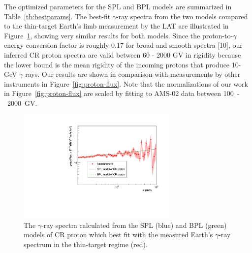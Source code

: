 The optimized parameters  for the SPL and BPL models are summarized in Table~\ref{tb:bestparams}. 
The best-fit $\gamma$-ray spectra from the two models
compared to the thin-target Earth's limb measurement by the LAT are illustrated
in Figure~\ref{fig:gamma-flux}, showing very similar results for both models.
Since the proton-to-$\gamma$ energy conversion factor is roughly 0.17 for broad
and smooth spectra [10], our inferred CR proton spectra are valid between 60 - 2000 GV
in rigidity
because the lower bound is the mean rigidity of the incoming protons that produce 10-GeV $\gamma$ rays.
Our results are shown in comparison with measurements by other instruments in Figure~\ref{fig:proton-flux}.
Note that the normalizations of our work in Figure~\ref{fig:proton-flux} are scaled
by fitting to AMS-02 data between 100~-~2000~GV.


\begin{figure}[h!]
    \centering
    \includegraphics[width=0.7\textwidth]{img/fitted_result}
    \caption{
        The $\gamma$-ray spectra calculated from the SPL (blue)
        and BPL (green) models of CR proton which best fit with the measured Earth's
        $\gamma$-ray spectrum in the thin-target regime (red).
    }
    \label{fig:gamma-flux}
\end{figure}



